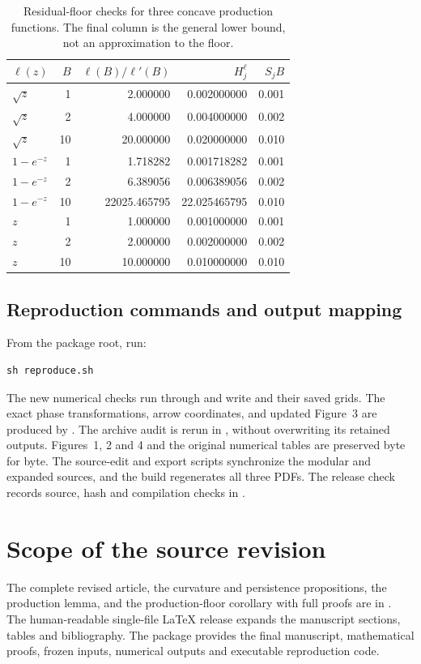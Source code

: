 \documentclass[11pt,a4paper]{article}
\begin{document}
\begin{table}[htbp]\centering
\caption{Residual-floor checks for three concave production functions.
The final column is the general lower bound, not an approximation to the
floor.}\label{tab:general-floor}
\begin{tabular}{@{}lrrrr@{}}\toprule
$\ell(z)$ & $B$ & $\ell(B)/\ell'(B)$ & $H_j^{\ell}$ & $S_jB$\\\midrule
$\sqrt z$ & 1 & 2.000000 & 0.002000000 & 0.001 \\
$\sqrt z$ & 2 & 4.000000 & 0.004000000 & 0.002 \\
$\sqrt z$ & 10 & 20.000000 & 0.020000000 & 0.010 \\
$1-e^{-z}$ & 1 & 1.718282 & 0.001718282 & 0.001 \\
$1-e^{-z}$ & 2 & 6.389056 & 0.006389056 & 0.002 \\
$1-e^{-z}$ & 10 & 22025.465795 & 22.025465795 & 0.010 \\
$z$ & 1 & 1.000000 & 0.001000000 & 0.001 \\
$z$ & 2 & 2.000000 & 0.002000000 & 0.002 \\
$z$ & 10 & 10.000000 & 0.010000000 & 0.010 \\
\bottomrule\end{tabular}\end{table}


\clearpage
\subsection*{Reproduction commands and output mapping}
From the package root, run:
\begin{verbatim}
sh reproduce.sh
\end{verbatim}
The new numerical checks run through  and
write  and their saved grids. The exact
phase transformations, arrow coordinates, and updated Figure~3 are
produced by . The archive audit is rerun in
, without overwriting its retained
outputs. Figures~1, 2 and 4 and the original numerical tables are
preserved byte for byte. The source-edit and export scripts synchronize
the modular and expanded sources, and the build regenerates all three
PDFs. The release check records source, hash and compilation checks in
.

\section{Scope of the source revision}
The complete revised article, the curvature and persistence propositions,
the production lemma, and the production-floor corollary with full proofs
are in
. The human-readable
single-file LaTeX release expands the manuscript sections,
tables and bibliography. The package provides the final manuscript,
mathematical proofs, frozen inputs, numerical outputs and executable
reproduction code.
\end{document}
